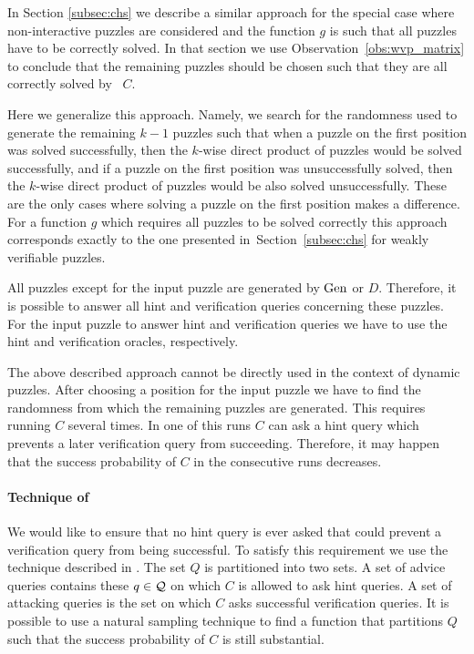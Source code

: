 In Section \ref{subsec:chs} we describe a similar approach for the special case where
non-interactive puzzles are considered and the function $g$ is such that all puzzles have to be correctly solved.
In that section we use Observation~\ref{obs:wvp_matrix} to conclude that the remaining puzzles should be chosen such that they
are all correctly solved by~ $C$.

Here we generalize this approach. Namely, we search for the randomness used to generate the remaining $k\!-\!1$ puzzles
such that when a puzzle on the first position was solved successfully, then the $k$-wise direct product of puzzles would be solved successfully,
and if a puzzle on the first position was unsuccessfully solved, then the $k$-wise direct product of puzzles would be also solved unsuccessfully.
These are the only cases where solving a puzzle on the first position makes a difference.
For a function $g$ which requires all puzzles to be solved correctly
this approach corresponds exactly to the one presented in~Section~\ref{subsec:chs} for weakly verifiable puzzles.

All puzzles except for the input puzzle are generated by $\operatorname{\text{Gen}}$ or $D$.
Therefore, it is possible to answer all hint and verification queries concerning these puzzles.
For the input puzzle to answer hint and verification queries we have to use the hint and verification oracles, respectively.

The above described approach cannot be directly used in the context of dynamic puzzles.
After choosing a position for the input puzzle we have to find the randomness from which the remaining puzzles are generated.
This requires running $C$ several times. In one of this runs $C$ can ask a hint query which prevents a later verification query from succeeding.
Therefore, it may happen that the success probability of $C$ in the consecutive runs decreases.

\paragraph{Technique of \cite{dodis2009security}}
We would like to ensure that no hint query is ever asked that could prevent a verification query from being successful.
To satisfy this requirement we use the technique described in \cite{dodis2009security}.
The set $Q$ is partitioned into two sets. A set of advice queries contains these $q \in \mathcal{Q}$ on which
$C$ is allowed to ask hint queries. A set of attacking queries is the set on which $C$ asks successful verification queries.
It is possible to use a natural sampling technique to find a function that partitions $Q$ such that
the success probability of $C$ is still substantial.

